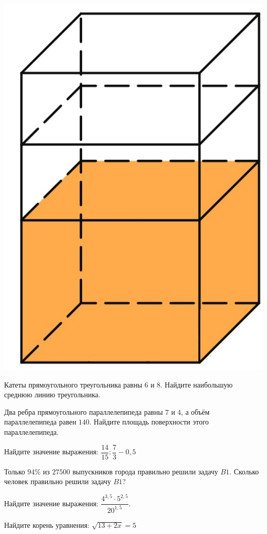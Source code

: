 \begin{training}[1]
\begin{listofex}
\begin{minipage}[t]{0.27\linewidth}
		\includegraphics[align=t, width=\linewidth]{../pics/G101M8H3-11}
	\end{minipage}
	\item Катеты прямоугольного треугольника равны \(6\) и \(8\). Найдите наибольшую среднюю линию треугольника.
	\item Два ребра прямоугольного параллелепипеда равны \(7\) и \(4\), а объём параллелепипеда равен \(140\). Найдите площадь поверхности этого параллелепипеда.
	\item Найдите значение выражения: \(\dfrac{ 14 }{15  }:\dfrac{ 7 }{ 3 }-0,5\)
	\item Только \(94\%\) из \(27 500\) выпускников города правильно решили задачу \(B1\). Сколько человек правильно решили задачу \(B1\)?
	\item Найдите значение выражения: \(\dfrac{ 4^{3,5}\cdot 5^{2,5} }{ 20^{1,5} }\).
	\item Найдите корень уравнения: \( \sqrt{13+2x}=5 \)

\end{listofex}
\end{training}
